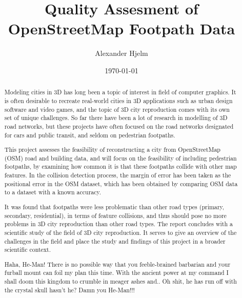 \documentclass{kththesis}
\title{Quality Assesment of OpenStreetMap Footpath Data}
\author{Alexander Hjelm}
\date{\today}
\begin{document}
\frontmatter

\titlepage

\begin{abstract}
Modeling cities in 3D has long been a topic of interest in field of computer graphics.
It is often desirable to recreate real-world cities in 3D applications such as urban design software and video games, and the topic of 3D city reproduction comes with its own set of unique challenges.
So far there have been a lot of research in modelling of 3D road networks, but these projects have often focused on the road networks designated for cars and public transit, and seldom on pedestrian footpaths.

This project assesses the feasibility of reconstructing a city from OpenStreetMap (OSM) road and building data, and will focus on the feasibility of including pedestrian footpaths, by examining how common it is that these footpaths collide with other map features.
In the collision detection process, the margin of error has been taken as the positional error in the OSM dataset, which has been obtained by comparing OSM data to a dataset with a known accuracy.

It was found that footpaths were less problematic than other road types (primary, secondary, residential), in terms of feature collisions, and thus should pose no more problems in 3D city reproduction than other road types.
The report concludes with a scientific study of the field of 3D city reproduction. It serves to give an overview of the challenges in the field and place the study and findings of this project in a broader scientific context. 
\end{abstract}

\begin{otherlanguage}{swedish}
\begin{abstract}
Haha, He-Man! There is no possible way that you feeble-brained barbarian and your furball mount can foil my plan this time. With the ancient power at my command I shall doom this kingdom to crumble in meager ashes and.. Oh shit, he has run off with the crystal skull hasn't he? Damn you He-Man!!!

\end{abstract}
\end{otherlanguage}

\tableofcontents

\mainmatter
\end{document}
